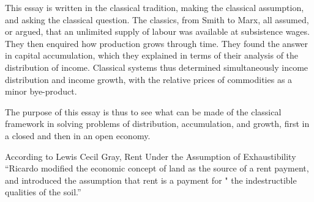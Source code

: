 \begin{tikzpicture}[scale=.5]





\end{tikzpicture}




This essay  is written in the classical tradition, making the classical assumption, and asking the classical question. The classics, from Smith to Marx,  all  assumed,  or argued, that an unlimited supply of labour was available at subsistence wages. They then enquired how production grows through time. They found the answer in capital accumulation, which they explained in terms of their analysis of the distribution of income. Classical systems thus determined simultaneously   income distribution and income growth, with the relative prices of commodities as a  minor bye-product.

The purpose of this essay is thus to see what  can be made of the classical  framework  in  solving  problems of distribution, accumulation, and growth, first in a closed and then in an open economy. 





According to  Lewis Cecil Gray, Rent Under the Assumption of Exhaustibility \cite{Gray1914RentUT}
``Ricardo modified the economic concept of land as the source of a rent payment, and introduced the assumption that rent is a payment for " the indestructible qualities of the soil.''

